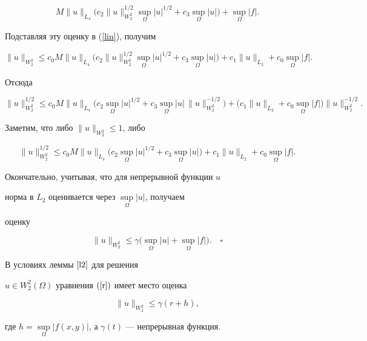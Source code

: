 $$


M\|u\|_{L_4}\big(c_2\|u\|^{1/2}_{W^2_2}


\sup_\Omega |u|^{1/2}+c_3\sup_\Omega |u|\big)


+\sup_\Omega |f|.


$$


Подставляя эту оценку в (\ref{lin}), получим


$$


\|u\|_{W^2_2}\le c_0M\|u\|_{L_4}\big(c_2\|u\|^{1/2}_{W^2_2}


\sup_\Omega |u|^{1/2}+c_3\sup_\Omega |u|\big)+


c_1\|u\|_{L_2}+c_0\sup_\Omega |f|.


$$


Отсюда


$$


\|u\|^{1/2}_{W^2_2}\le c_0M\|u\|_{L_4}\big(c_2\sup_\Omega


|u|^{1/2}+c_3\sup_\Omega |u|\, \|u\|^{-1/2}_{W^2_2}\big)+


\big(c_1\|u\|_{L_2}+c_0\sup_\Omega |f|\big) \|u\|^{-1/2}_{W^2_2}.


$$


Заметим, что либо $\|u\|_{W^2_2}\le 1$, либо


$$


\|u\|^{1/2}_{W^2_2}\le c_0M\|u\|_{L_4}\big(c_2\sup_\Omega


|u|^{1/2}+c_3\sup_\Omega |u|\big)+c_1\|u\|_{L_2}


+c_0\sup_\Omega |f|.


$$


Окончательно, учитывая, что для непрерывной функции $u$


норма в $L_2$ оценивается через $\sup \limits_\Omega |u|$, получаем


оценку


$$


\|u\|_{W^2_2}\le \gamma\big(\sup_\Omega |u|


+\sup \limits_\Omega |f|\big).\quad\square


$$





\begin{thm}\label{t1}


В условиях леммы $\ref{l2}$ для решения 


$u \in W^2_2(\Omega)$ уравнения $(\ref{r})$ имеет место оценка


$$


\|u\|_{W^2_2}\le \gamma(r+h),


$$


где $h=\sup \limits_\Omega |f(x,y)|$, а $\gamma(t)$ --- непрерывная функция. 


\end{thm}





